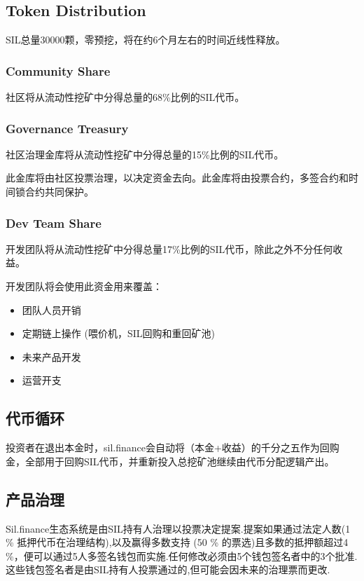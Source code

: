 \documentclass[11pt,letterpaper]{article}
\begin{document}
\begin{multicols}{2}
\subsection{Token Distribution}
SIL总量30000颗，零预挖，将在约6个月左右的时间近线性释放。

\subsubsection{Community Share}
社区将从流动性挖矿中分得总量的68\%比例的SIL代币。

\subsubsection{Governance Treasury}
社区治理金库将从流动性挖矿中分得总量的15\%比例的SIL代币。

此金库将由社区投票治理，以决定资金去向。此金库将由投票合约，多签合约和时间锁合约共同保护。

\subsubsection{Dev Team Share}
开发团队将从流动性挖矿中分得总量17\%比例的SIL代币，除此之外不分任何收益。

开发团队将会使用此资金用来覆盖：
\begin{itemize}
    \item 团队人员开销
    \item 定期链上操作 (喂价机，SIL回购和重回矿池)
    \item 未来产品开发
    \item 运营开支
\end{itemize}

\subsection{代币循环}
投资者在退出本金时，sil.finance会自动将（本金+收益）的千分之五作为回购金，全部用于回购SIL代币，并重新投入总挖矿池继续由代币分配逻辑产出。

\subsection{产品治理}
Sil.finance生态系统是由SIL持有人治理以投票决定提案.提案如果通过法定人数(1 \% 抵押代币在治理结构),以及赢得多数支持 (50 \% 的票选)且多数的抵押额超过4 \%，便可以通过5人多签名钱包而实施.任何修改必须由5个钱包签名者中的3个批准.这些钱包签名者是由SIL持有人投票通过的,但可能会因未来的治理票而更改.


\end{multicols}
\end{document}
